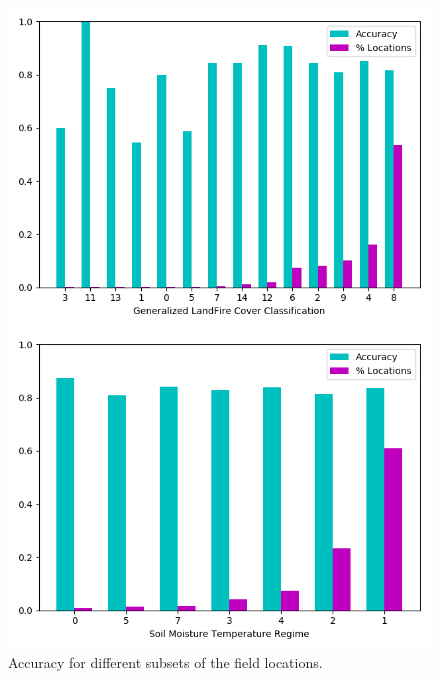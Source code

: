 \def\year{2017}\relax \documentclass[letterpaper]{article}
\begin{document}
\begin{figure}
\begin{minipage}{.24\textwidth}
  \centering
\includegraphics[width=\textwidth]{pics/d4_accuracy_vs_landcover.png}
\caption{$D_3$}
\end{minipage}
\begin{minipage}{.01\textwidth}
\end{minipage}
\begin{minipage}{.24\textwidth}
  \centering
\includegraphics[width=\textwidth]{pics/d4_accuracy_vs_soil.png}
\caption{$D_4$}
\end{minipage}
\caption{Accuracy for different subsets of the field locations.}\label{fig:testmetrics}
\end{figure}
\end{document}
